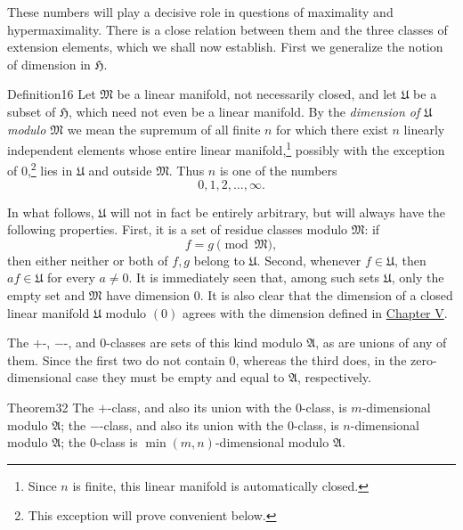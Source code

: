 ﻿\documentclass[paper=b5,fontsize=13pt,bookmarkpackage=false,twoside]{scrartcl}
\begin{document}
These numbers will play a decisive role in questions of maximality and hypermaximality. There is a close relation between them and the three classes of extension elements, which we shall now establish. First we generalize the notion of dimension in $\mathfrak H$.

\begin{namedstatement}{Definition}{16}\label{def:16}
Let $\mathfrak M$ be a linear manifold, not necessarily closed, and let $\mathfrak U$ be a subset of $\mathfrak H$, which need not even be a linear manifold. By the \emph{dimension of $\mathfrak U$ modulo $\mathfrak M$} we mean the supremum of all finite $n$ for which there exist $n$ linearly independent elements whose entire linear manifold,\footnote{\label{fn:44}Since $n$ is finite, this linear manifold is automatically closed.} possibly with the exception of $0$,\footnote{\label{fn:45}This exception will prove convenient below.} lies in $\mathfrak U$ and outside $\mathfrak M$. Thus $n$ is one of the numbers
\[
0,1,2,\ldots,\infty.
\]
\end{namedstatement}

In what follows, $\mathfrak U$ will not in fact be entirely arbitrary, but will always have the following properties. First, it is a set of residue classes modulo $\mathfrak M$: if
\[
f=g\pmod{\mathfrak M},
\]
then either neither or both of $f,g$ belong to $\mathfrak U$. Second, whenever $f\in\mathfrak U$, then $af\in\mathfrak U$ for every $a\ne0$. It is immediately seen that, among such sets $\mathfrak U$, only the empty set and $\mathfrak M$ have dimension $0$. It is also clear that the dimension of a closed linear manifold $\mathfrak U$ modulo $(0)$ agrees with the dimension defined in \hyperref[chap:V]{Chapter V}.

The $+$-, $-$-, and $0$-classes are sets of this kind modulo $\mathfrak A$, as are unions of any of them. Since the first two do not contain $0$, whereas the third does, in the zero-dimensional case they must be empty and equal to $\mathfrak A$, respectively.

\begin{namedstatement}{Theorem}{32}\label{thm:32}
The $+$-class, and also its union with the $0$-class, is $m$-dimensional modulo $\mathfrak A$; the $-$-class, and also its union with the $0$-class, is $n$-dimensional modulo $\mathfrak A$; the $0$-class is $\min(m,n)$-dimensional modulo $\mathfrak A$.
\end{namedstatement}
\end{document}
